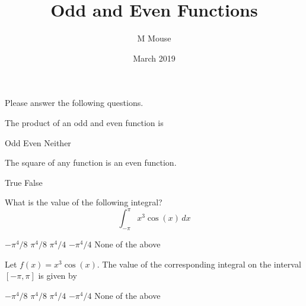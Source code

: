 \documentclass[12pt,a4paper]{exam}
\title{Odd and Even Functions}
\author{M Mouse}
\date{March 2019}
\begin{document}
\maketitle

\begin{center}\large\sc Please answer the following questions.\end{center}

\bigskip
\begin{questions}

\question[5] 
The product of an odd and even function is 
\begin{choices}
\correctchoice Odd
\choice Even
\choice Neither
\end{choices}

\question[5]
The square of any function is an even function.
\begin{choices}
\choice True
\correctchoice False
\end{choices}

\question[5] 
What is the value of the following integral?
\[
\int_{-\pi}^{\pi} x^3\cos(x)\,dx
\]
\begin{choices}
\choice $-\pi^4/8$
\choice $\pi^4/8$
\choice $\pi^4/4$
\choice $-\pi^4/4$
\correctchoice None of the above
\end{choices}

\question[5] 
Let $f(x) = x^3\cos(x)$. The value of the corresponding integral on the interval $[-\pi, \pi]$ is given by 
\begin{choices}
\choice $-\pi^4/8$
\choice $\pi^4/8$
\choice $\pi^4/4$
\choice $-\pi^4/4$
\correctchoice None of the above
\end{choices}

\end{questions}
\end{document}
